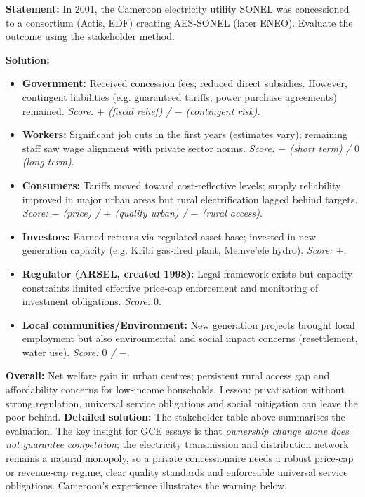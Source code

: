 \documentclass[11pt]{article}
\newcommand{\cle}[1]{{\popxbold\color{popdark}#1}}
\begin{document}
\begin{exoresolu}
\textbf{Statement:} In 2001, the Cameroon electricity utility SONEL was concessioned to a consortium (Actis, EDF) creating AES-SONEL (later ENEO).  Evaluate the outcome using the stakeholder method.

\textbf{Solution:}
\begin{itemize}
    \item \textbf{Government:} Received concession fees; reduced direct subsidies.  However, contingent liabilities (e.g. guaranteed tariffs, power purchase agreements) remained.  \textit{Score: $+$ (fiscal relief) / $-$ (contingent risk)}.
    \item \textbf{Workers:} Significant job cuts in the first years (estimates vary); remaining staff saw wage alignment with private sector norms.  \textit{Score: $-$ (short term) / $0$ (long term)}.
    \item \textbf{Consumers:} Tariffs moved toward cost‑reflective levels; supply reliability improved in major urban areas but rural electrification lagged behind targets.  \textit{Score: $-$ (price) / $+$ (quality urban) / $-$ (rural access)}.
    \item \textbf{Investors:} Earned returns via regulated asset base; invested in new generation capacity (e.g. Kribi gas-fired plant, Memve'ele hydro).  \textit{Score: $+$}.
    \item \textbf{Regulator (ARSEL, created 1998):} Legal framework exists but capacity constraints limited effective price‑cap enforcement and monitoring of investment obligations.  \textit{Score: $0$}.
    \item \textbf{Local communities/Environment:} New generation projects brought local employment but also environmental and social impact concerns (resettlement, water use).  \textit{Score: $0$ / $-$}.
\end{itemize}
\textbf{Overall:} Net welfare gain in urban centres; persistent rural access gap and affordability concerns for low‑income households.  Lesson: privatisation without strong regulation, universal service obligations and social mitigation can leave the poor behind.
\tcblower
\textbf{Detailed solution:} The stakeholder table above summarises the evaluation.  The key insight for GCE essays is that \emph{ownership change alone does not guarantee competition}; the electricity transmission and distribution network remains a natural monopoly, so a private concessionaire needs a robust price‑cap or revenue‑cap regime, clear quality standards and enforceable universal service obligations.  Cameroon's experience illustrates the \cle{warning} below.
\end{exoresolu}
\end{document}
